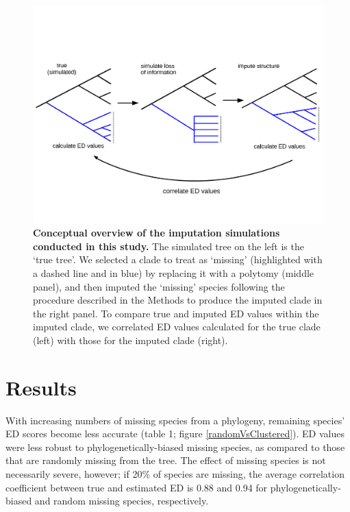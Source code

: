 \documentclass[10pt,english]{article}
\begin{document}
\begin{figure}[!ht]
  \center
  \includegraphics[width=.75\textwidth]{imputeConcept.png}
  \caption{\textbf{Conceptual overview of the imputation simulations conducted
  in this study.} The simulated tree on the left is the ‘true tree'. We selected
  a clade to treat as ‘missing' (highlighted with a dashed line and in blue) by
  replacing it with a polytomy (middle panel), and then imputed the ‘missing'
  species following the procedure described in the Methods to produce the
  imputed clade in the right panel. To compare true and imputed ED values within
  the imputed clade, we correlated ED values calculated for the true clade
  (left) with those for the imputed clade (right).}
  \label{imputeConcept}
\end{figure}

\section*{Results}
With increasing numbers of missing species from a phylogeny, remaining species’
ED scores become less accurate (table 1; figure \ref{randomVsClustered}). ED
values were less robust to phylogenetically-biased missing species, as compared
to those that are randomly missing from the tree. The effect of missing species
is not necessarily severe, however; if 20\% of species are missing, the average
correlation coefficient between true and estimated ED is 0.88 and 0.94 for
phylogenetically-biased and random missing species, respectively.
\end{document}
